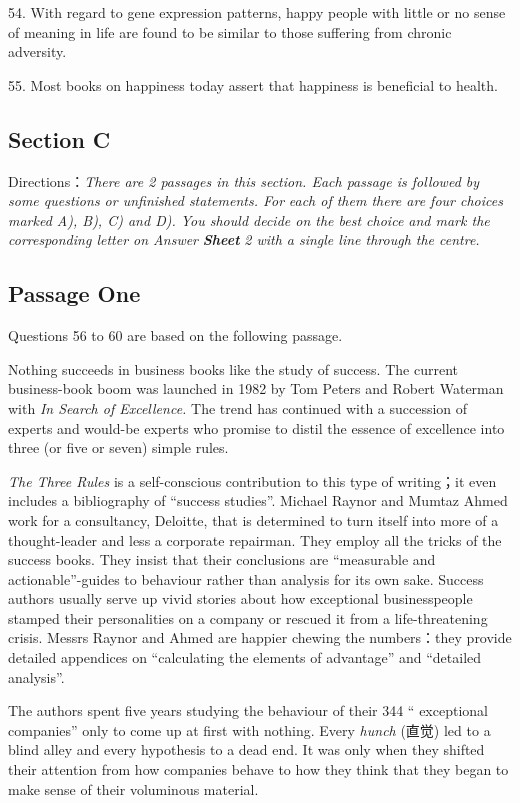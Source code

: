 \documentclass[UTF8,11pt]{ctexart}
\begin{document}
54. With regard to gene expression patterns, happy people with little or no sense of meaning in life are found to be similar to those suffering from chronic adversity.


55. Most books on happiness today assert that happiness is beneficial to health.


\subsection*{\textbf{Section C}}


Directions：\textit{There are 2 passages in this section. Each passage is followed by some questions or unfinished statements. For} \textit{each of them there are four choices marked A), B), C) and D). You should decide on the best choice and mark the} \textit{corresponding letter on Answer}\textbf{\textit{ Sheet}}\textit{ 2 with a single line through the centre.}


\subsection*{Passage One}


Questions 56 to 60 are based on the following passage.


Nothing succeeds in business books like the study of success. The current business-book boom was launched in 1982 by Tom Peters and Robert Waterman with\textit{ In Search of Excellence.} The trend has continued with a succession of experts and would-be experts who promise to distil the essence of excellence into three (or five or seven) simple rules.


\textit{The Three Rules} is a self-conscious contribution to this type of writing；it even includes a bibliography of “success studies”. Michael Raynor and Mumtaz Ahmed work for a consultancy, Deloitte, that is determined to turn itself into more of a thought-leader and less a corporate repairman. They employ all the tricks of the success books. They insist that their conclusions are “measurable and actionable”-guides to behaviour rather than analysis for its own sake. Success authors usually serve up vivid stories about how exceptional businesspeople stamped their personalities on a company or rescued it from a life-threatening crisis. Messrs Raynor and Ahmed are happier chewing the numbers：they provide detailed appendices on “calculating the elements of advantage” and “detailed analysis”.


The authors spent five years studying the behaviour of their 344 “ exceptional companies” only to come up at first with nothing. Every\textit{ hunch} (直觉) led to a blind alley and every hypothesis to a dead end. It was only when they shifted their attention from how companies behave to how they think that they began to make sense of their voluminous material.
\end{document}
